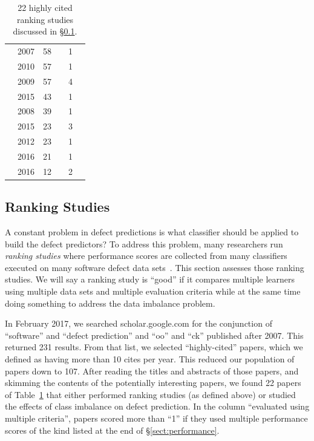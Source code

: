 \documentclass[10pt,conference]{IEEEtran}
\newcommand{\cmark}{\ding{51}}%
\newcommand{\xmark}{\ding{55}}%
\theoremstyle{break}
\theoremstyle{break}
\newcommand{\tion}[1]{{\S}\ref{sect:#1}}
\begin{document}
\begin{table}[!t]
\begin{tabular}{c@{~}|c@{~}|c@{~}|c@{~}|c@{~}|c@{~}}
        \cite{pelayo2007applying} & 2007 & 58 & \xmark & 1 & \cmark \\  
        \cite{khoshgoftaar2010attribute} & 2010 & 57 & \cmark & 1 & \cmark  \\  
        \cite{jiang2009variance} & 2009 & 57 & \cmark & 4 & \xmark  \\  
        \cite{ghotra2015revisiting} & 2015 & 43 & \cmark & 1 & \xmark  \\  
        \cite{jiang2008can} & 2008 & 39 & \cmark & 1 & \cmark  \\  
        \cite{tan2015online} & 2015 & 23 & \xmark & 3 & \cmark \\  
        \cite{pelayo2012evaluating} & 2012 & 23 & \xmark & 1 & \cmark \\  
        \cite{tantithamthavorn2016automated} & 2016 & 21 & \cmark & 1 & \xmark\\  
        \cite{fu2016tuning} & 2016 & 12 & \cmark & 2 & \xmark  \\    
\end{tabular}
\caption{22 highly cited ranking studies discussed in \tion{rank}.}
\label{tbl:survey2}
\vspace{-0.5cm}
\end{table}

\subsection{Ranking Studies}
\label{sect:rank}

A constant problem in defect predictions is what  classifier should be applied to  build  the  defect  predictors?
To address this problem, many researchers run {\em ranking studies} where  performance scores 
are collected from  many classifiers  executed on  many software defect data sets~\cite{lessmann2008benchmarking,hall2012systematic,elish2008predicting,menzies2010defect,gondra2008applying,radjenovic2013software,jiang2008techniques,wang2013using,mende2009revisiting,li2012sample,khoshgoftaar2010attribute,jiang2009variance,ghotra2015revisiting,jiang2008can,tantithamthavorn2016automated,fu2016tuning}.
This section assesses those ranking studies. We will say a ranking study is ``good'' if it compares multiple learners using multiple data sets and multiple evaluation criteria
while at the same time doing something to address the data imbalance problem.

 In February  2017,  we searched
scholar.google.com for the conjunction of ``software'' and ``defect prediction'' and ``oo'' and ``ck'' published after 2007. This returned 231 results.
From that list, we selected ``highly-cited'' papers, which we defined as having more than 10 cites per year.  This reduced our population of papers down to 107.
After reading the titles and abstracts of those papers, and skimming the contents of the potentially interesting papers, we found 22 papers of Table~\ref{tbl:survey2} that either performed ranking studies
(as defined above) or studied the effects of class imbalance on defect prediction. In the column ``evaluated using
multiple criteria'',
papers scored more than ``1'' if they used multiple performance scores  of the kind listed at the end of \tion{performance}. 
\end{document}
